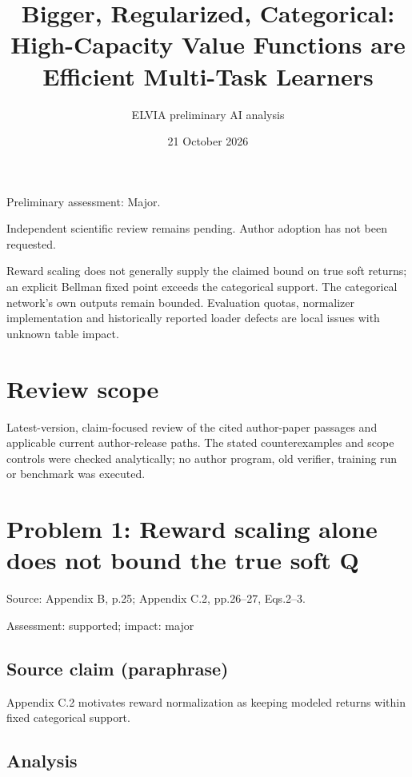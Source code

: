 \documentclass[11pt]{article}
\begin{document}
\title{Bigger, Regularized, Categorical: High-Capacity Value Functions are Efficient Multi-Task Learners}

\author{ELVIA preliminary AI analysis}\date{21 October 2026}\maketitle

Preliminary assessment: Major.\par

Independent scientific review remains pending. Author adoption has not been requested.

Reward scaling does not generally supply the claimed bound on true soft returns; an explicit Bellman fixed point exceeds the categorical support. The categorical network's own outputs remain bounded. Evaluation quotas, normalizer implementation and historically reported loader defects are local issues with unknown table impact.

\section*{Review scope}

Latest-version, claim-focused review of the cited author-paper passages and applicable current author-release paths. The stated counterexamples and scope controls were checked analytically; no author program, old verifier, training run or benchmark was executed.

\section*{Problem 1: Reward scaling alone does not bound the true soft Q}

Source: Appendix B, p.25; Appendix C.2, pp.26–27, Eqs.2–3.

Assessment: supported; impact: major

\subsection*{Source claim (paraphrase)}

Appendix C.2 motivates reward normalization as keeping modeled returns within fixed categorical support.

\subsection*{Analysis}
\end{document}
